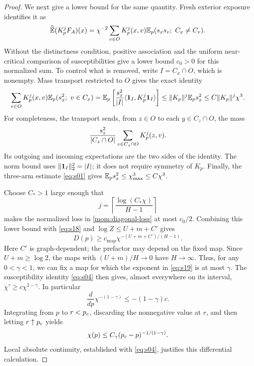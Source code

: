 \begin{proof}
We next give a lower bound for the same quantity.  Fresh exterior
exposure identifies it as
\[
 \widehat{\mathbb E}(K_p^jF_A)(x)
 =\chi^{-2}\sum_{v\in O}K_p^j(x,v)
                  \mathbb E_p(s_xs_v;\ C_x\ne C_v).
\]
Without the distinctness condition, positive association and the
uniform near-critical comparison of susceptibilities give a lower
bound $c_0>0$ for this normalized sum.  To control what is removed,
write $I=C_x\cap O$, which is nonempty.  Mass transport restricted to
$O$ gives the exact identity
\begin{equation}
 \sum_{v\in O}K_p^j(x,v)\mathbb E_p(s_x^2;\ v\in C_x)
 =\mathbb E_p\left[\frac{s_x^2}{\lvert I\rvert}
                  \langle\mathbf 1_I,K_p^j\mathbf 1_I\rangle\right]
 \le \lVert K_p\rVert^{j}\mathbb E_p s_x^2
 \le C\lVert K_p\rVert^{j}\chi^3.
 \label{mom:diagonal-loss}
\end{equation}
For completeness, the transport sends, from $z\in O$ to each
$y\in C_z\cap O$, the mass
\[
 \frac{s_z^2}{\lvert C_z\cap O\rvert}
       \sum_{v\in C_z\cap O}K_p^j(z,v).
\]
Its outgoing and incoming expectations are the two sides of the
identity.  The norm bound uses
$\lVert\mathbf 1_I\rVert_2^2=\lvert I\rvert$; it does not require symmetry of $K_p$.
Finally, the three-arm estimate \eqref{eq:s01} gives
$\mathbb E_p s_x^2\le\chi_{\max}^3\le C\chi^3$.

Choose $C_*>1$ large enough that
\[
 j=\left\lceil\frac{\log(C_*\chi)}{H-1}\right\rceil
\]
makes the normalized loss in \eqref{mom:diagonal-loss} at most
$c_0/2$.  Combining this lower bound with \eqref{eq:s18} and
$\log Z\le U+m+C'$ gives
\begin{equation}
 D(p)\ge c_{\mathrm{map}}
               \chi^{-(U+m+C')/(H-1)}.
 \label{eq:s19}
\end{equation}
Here $C'$ is graph-dependent; the prefactor may depend on the fixed
map.  Since $U+m\ge\log2$, the maps with $(U+m)/H\to0$ have
$H\to\infty$.  Thus, for any $0<\gamma<1$, we can fix a map for
which the exponent in \eqref{eq:s19} is at most $\gamma$.
The susceptibility identity \eqref{eq:s04} then gives, almost
everywhere on its interval,
$\chi'\ge c\chi^{2-\gamma}$.  In particular
\[
 \frac{d}{dp}\chi^{-(1-\gamma)}
       \le -(1-\gamma)c.
\]
Integrating from $p$ to $r<{p_c}$, discarding the nonnegative value at
$r$, and then letting $r\uparrow{p_c}$ yields
\begin{equation}
 \chi(p)\le C_\gamma({p_c}-p)^{-1/(1-\gamma)}.
 \label{eq:s20}
\end{equation}
Local absolute continuity, established with \eqref{eq:s04},
justifies this differential calculation.


\end{proof}
